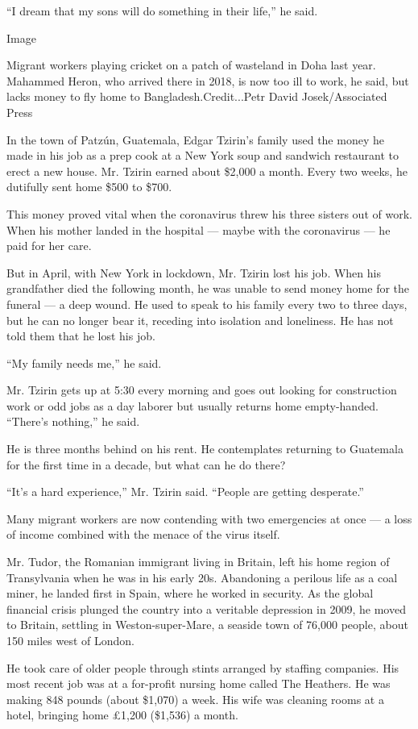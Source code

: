 ``I dream that my sons will do something in their life,'' he said.

Image

Migrant workers playing cricket on a patch of wasteland in Doha last
year. Mahammed Heron, who arrived there in 2018, is now too ill to work,
he said, but lacks money to fly home to Bangladesh.Credit...Petr David
Josek/Associated Press

In the town of Patzún, Guatemala, Edgar Tzirin's family used the money
he made in his job as a prep cook at a New York soup and sandwich
restaurant to erect a new house. Mr. Tzirin earned about \$2,000 a
month. Every two weeks, he dutifully sent home \$500 to \$700.

This money proved vital when the coronavirus threw his three sisters out
of work. When his mother landed in the hospital --- maybe with the
coronavirus --- he paid for her care.

But in April, with New York in lockdown, Mr. Tzirin lost his job. When
his grandfather died the following month, he was unable to send money
home for the funeral --- a deep wound. He used to speak to his family
every two to three days, but he can no longer bear it, receding into
isolation and loneliness. He has not told them that he lost his job.

``My family needs me,'' he said.

Mr. Tzirin gets up at 5:30 every morning and goes out looking for
construction work or odd jobs as a day laborer but usually returns home
empty-handed. ``There's nothing,'' he said.

He is three months behind on his rent. He contemplates returning to
Guatemala for the first time in a decade, but what can he do there?

``It's a hard experience,'' Mr. Tzirin said. ``People are getting
desperate.''

Many migrant workers are now contending with two emergencies at once ---
a loss of income combined with the menace of the virus itself.

Mr. Tudor, the Romanian immigrant living in Britain, left his home
region of Transylvania when he was in his early 20s. Abandoning a
perilous life as a coal miner, he landed first in Spain, where he worked
in security. As the global financial crisis plunged the country into a
veritable depression in 2009, he moved to Britain, settling in
Weston-super-Mare, a seaside town of 76,000 people, about 150 miles west
of London.

He took care of older people through stints arranged by staffing
companies. His most recent job was at a for-profit nursing home called
The Heathers. He was making 848 pounds (about \$1,070) a week. His wife
was cleaning rooms at a hotel, bringing home £1,200 (\$1,536) a month.

